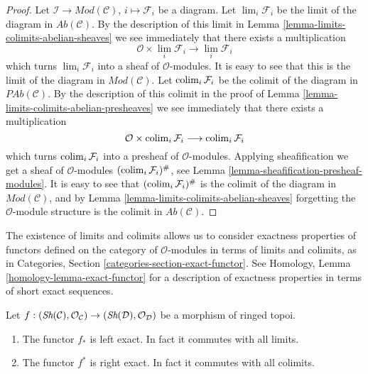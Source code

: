 \begin{proof}
Let $\mathcal{I} \to \textit{Mod}(\mathcal{C})$, $i \mapsto \mathcal{F}_i$
be a diagram. Let $\lim_i \mathcal{F}_i$ be the limit of the diagram
in $\textit{Ab}(\mathcal{C})$. By the description of this limit in
Lemma \ref{lemma-limits-colimits-abelian-sheaves} we see immediately that
there exists a multiplication
$$
\mathcal{O} \times \lim_i \mathcal{F}_i
\longrightarrow
\lim_i \mathcal{F}_i
$$
which turns $\lim_i \mathcal{F}_i$ into a sheaf of
$\mathcal{O}$-modules. It is easy to see that this is the
limit of the diagram in $\textit{Mod}(\mathcal{C})$. Let
$\mathop{\rm colim}\nolimits_i \mathcal{F}_i$ be the colimit of the diagram
in $\textit{PAb}(\mathcal{C})$. By the description of this colimit
in the proof of Lemma \ref{lemma-limits-colimits-abelian-presheaves}
we see immediately that there exists a multiplication
$$
\mathcal{O} \times \mathop{\rm colim}\nolimits_i \mathcal{F}_i
\longrightarrow
\mathop{\rm colim}\nolimits_i \mathcal{F}_i
$$
which turns $\mathop{\rm colim}\nolimits_i \mathcal{F}_i$ into a presheaf of
$\mathcal{O}$-modules. Applying sheafification we get a
sheaf of $\mathcal{O}$-modules $(\mathop{\rm colim}\nolimits_i \mathcal{F}_i)^\#$,
see Lemma \ref{lemma-sheafification-presheaf-modules}.
It is easy to see that $(\mathop{\rm colim}\nolimits_i \mathcal{F}_i)^\#$
is the colimit of the diagram in $\textit{Mod}(\mathcal{C})$, and
by Lemma \ref{lemma-limits-colimits-abelian-sheaves}
forgetting the $\mathcal{O}$-module structure is
the colimit in $\textit{Ab}(\mathcal{C})$.
\end{proof}

\noindent
The existence of limits and colimits allows us to consider exactness
properties of functors defined on the category of $\mathcal{O}$-modules
in terms of limits and colimits, as in
Categories, Section \ref{categories-section-exact-functor}.
See Homology, Lemma \ref{homology-lemma-exact-functor} for a description of
exactness properties in terms of short exact sequences.

\begin{lemma}
\label{lemma-exactness-pushforward-pullback}
Let $f : (\mathop{\textit{Sh}}\nolimits(\mathcal{C}), \mathcal{O}_\mathcal{C})
\to (\mathop{\textit{Sh}}\nolimits(\mathcal{D}), \mathcal{O}_\mathcal{D})$
be a morphism of ringed topoi.
\begin{enumerate}
\item The functor $f_*$ is left exact. In fact it commutes with
all limits.
\item The functor $f^*$ is right exact. In fact it commutes
with all colimits.
\end{enumerate}
\end{lemma}

